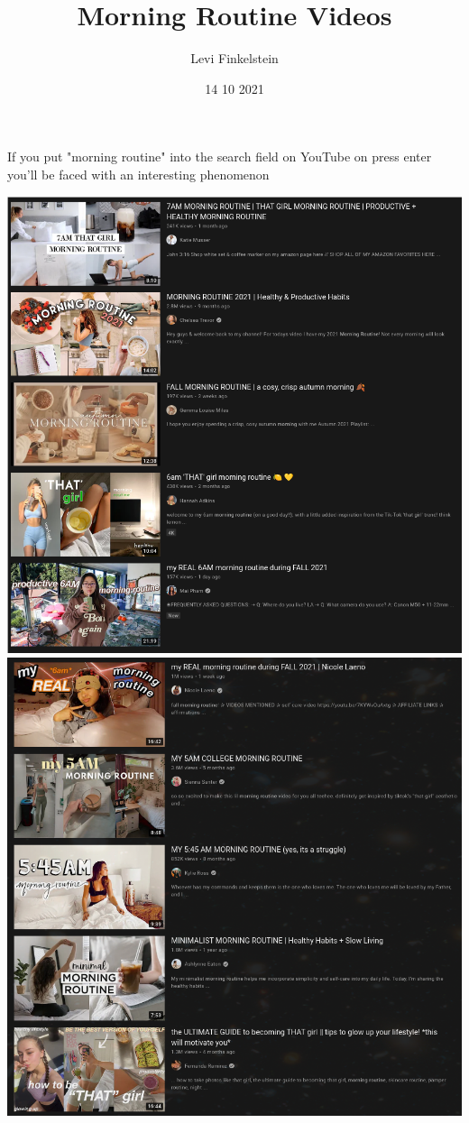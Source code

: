 \title{Morning Routine Videos}
\author{Levi Finkelstein}
\date{14 10 2021}


\maketitle

If you put "morning routine" into the search field on YouTube on press enter you'll be faced with an interesting phenomenon

\includegraphics{mr1}
\includegraphics{mr2}

